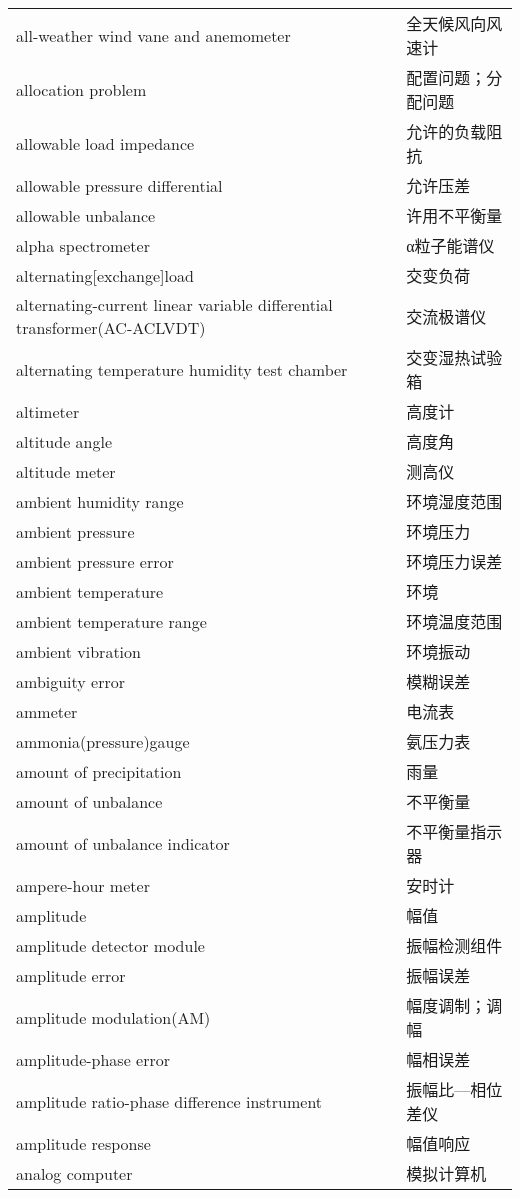 \documentclass[
]{article}
\begin{document}
\begin{longtable}[]{@{}ll@{}}
all-weather wind vane and anemometer & 全天候风向风速计 \\
allocation problem & 配置问题；分配问题 \\
allowable load impedance & 允许的负载阻抗 \\
allowable pressure differential & 允许压差 \\
allowable unbalance & 许用不平衡量 \\
alpha spectrometer & α粒子能谱仪 \\
alternating{[}exchange{]}load & 交变负荷 \\
alternating-current linear variable differential transformer(AC-ACLVDT)
& 交流极谱仪 \\
alternating temperature humidity test chamber & 交变湿热试验箱 \\
altimeter & 高度计 \\
altitude angle & 高度角 \\
altitude meter & 测高仪 \\
ambient humidity range & 环境湿度范围 \\
ambient pressure & 环境压力 \\
ambient pressure error & 环境压力误差 \\
ambient temperature & 环境 \\
ambient temperature range & 环境温度范围 \\
ambient vibration & 环境振动 \\
ambiguity error & 模糊误差 \\
ammeter & 电流表 \\
ammonia(pressure)gauge & 氨压力表 \\
amount of precipitation & 雨量 \\
amount of unbalance & 不平衡量 \\
amount of unbalance indicator & 不平衡量指示器 \\
ampere-hour meter & 安时计 \\
amplitude & 幅值 \\
amplitude detector module & 振幅检测组件 \\
amplitude error & 振幅误差 \\
amplitude modulation(AM) & 幅度调制；调幅 \\
amplitude-phase error & 幅相误差 \\
amplitude ratio-phase difference instrument & 振幅比---相位差仪 \\
amplitude response & 幅值响应 \\
analog computer & 模拟计算机 \\

\end{longtable}
\end{document}
